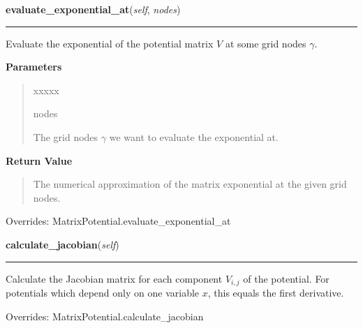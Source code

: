 \hspace{.8\funcindent}\begin{boxedminipage}{\funcwidth}

    \raggedright \textbf{evaluate\_exponential\_at}(\textit{self}, \textit{nodes})

    \vspace{-1.5ex}

    \rule{\textwidth}{0.5\fboxrule}
\setlength{\parskip}{2ex}
    Evaluate the exponential of the potential matrix $V$ at some grid
    nodes $\gamma$.

\setlength{\parskip}{1ex}
      \textbf{Parameters}
      \vspace{-1ex}

      \begin{quote}
        \begin{Ventry}{xxxxx}

          \item[nodes]

          The grid nodes $\gamma$ we want to evaluate the
          exponential at.

        \end{Ventry}

      \end{quote}

      \textbf{Return Value}
    \vspace{-1ex}

      \begin{quote}
      The numerical approximation of the matrix exponential at the given
      grid nodes.

      \end{quote}



      Overrides: MatrixPotential.evaluate\_exponential\_at

    \end{boxedminipage}

    \vspace{0.5ex}

\hspace{.8\funcindent}\begin{boxedminipage}{\funcwidth}

    \raggedright \textbf{calculate\_jacobian}(\textit{self})

    \vspace{-1.5ex}

    \rule{\textwidth}{0.5\fboxrule}
\setlength{\parskip}{2ex}
    Calculate the Jacobian matrix for each component $V_{i,j}$ of the
    potential. For potentials which depend only on one variable $x$, this
    equals the first derivative.

\setlength{\parskip}{1ex}


      Overrides: MatrixPotential.calculate\_jacobian

    \end{boxedminipage}

